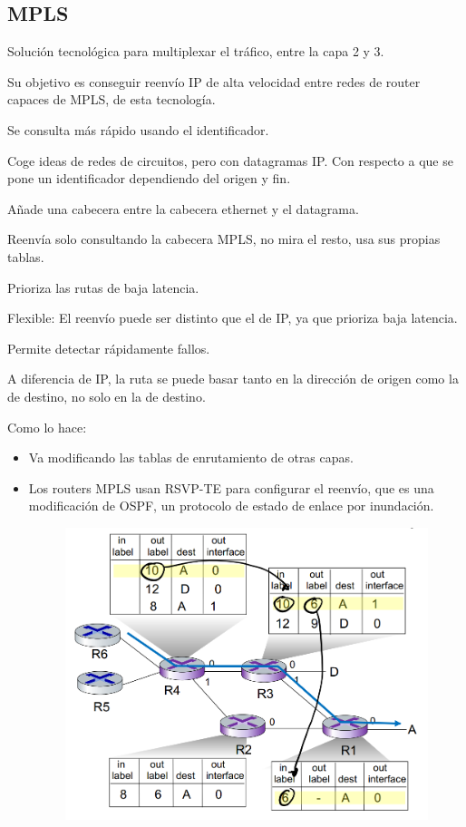 \documentclass[12pt, twoside, openright]{report} %
\begin{document}
\subsection{MPLS}


Solución tecnológica para multiplexar el tráfico, entre la capa
2 y 3.

Su objetivo es conseguir reenvío IP de alta velocidad entre
redes de router capaces de MPLS, de esta tecnología.

Se consulta más rápido usando el identificador.

Coge ideas de redes de circuitos, pero con datagramas IP. Con
respecto a que se pone un identificador dependiendo del origen y
fin.

Añade una cabecera entre la cabecera ethernet y el datagrama.

Reenvía solo consultando la cabecera MPLS, no mira el resto, usa
sus propias tablas.

Prioriza las rutas de baja latencia.

Flexible: El reenvío puede ser distinto que el de IP, ya que
prioriza baja latencia.

Permite detectar rápidamente fallos.

A diferencia de IP, la ruta se puede basar tanto en la dirección
de origen como la de destino, no solo en la de destino.

Como lo hace:
\begin{itemize}
	\item Va modificando las tablas de enrutamiento de otras capas.
	\item Los routers MPLS usan RSVP-TE para configurar el reenvío, que es una
	      modificación de OSPF, un protocolo de estado de enlace por
	      inundación.
	      \begin{figure}[H]
		      {\includegraphics[scale=.25]{Untitled 66.png}}
	      \end{figure}
\end{itemize}
\end{document}
